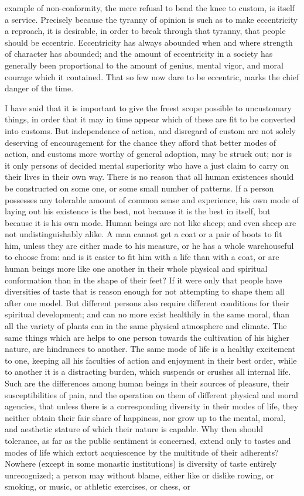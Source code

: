 \documentclass[12pt]{report}
\begin{document}
example of non-conformity, the mere refusal to bend the knee to custom, is itself a service. Precisely because the tyranny of opinion is such as to make eccentricity a reproach, it is desirable, in order to break through that tyranny, that people should be eccentric. Eccentricity has always abounded when and where strength of character has abounded; and the amount of eccentricity in a society has generally been proportional to the amount of genius, mental vigor, and moral courage which it contained. That so few now dare to be eccentric, marks the chief danger of the time.

I have said that it is important to give the freest scope possible to uncustomary things, in order that it may in time appear which of these are fit to be converted into customs. But independence of action, and disregard of custom are not solely deserving of encouragement for the chance they afford that better modes of action, and customs more worthy of general adoption, may be struck out; nor is it only persons of decided mental superiority who have a just claim to carry on their lives in their own way. There is no reason that all human existences should be constructed on some one, or some small number of patterns. If a person possesses any tolerable amount of common sense and experience, his own mode of laying out his existence is the best, not because it is the best in itself, but because it is his own mode. Human beings are not like sheep; and even sheep are not undistinguishably alike. A man cannot get a coat or a pair of boots to fit him, unless they are either made to his measure, or he has a whole warehouseful to choose from: and is it easier to fit him with a life than with a coat, or are human beings more like one another in their whole physical and spiritual conformation than in the shape of their feet? If it were only that people have diversities of taste that is reason enough for not attempting to shape them all after one model. But different persons also require different conditions for their spiritual development; and can no more exist healthily in the same moral, than all the variety of plants can in the same physical atmosphere and climate. The same things which are helps to one person towards the cultivation of his higher nature, are hindrances to another. The same mode of life is a healthy excitement to one, keeping all his faculties of action and enjoyment in their best order, while to another it is a distracting burden, which suspends or crushes all internal life. Such are the differences among human beings in their sources of pleasure, their susceptibilities of pain, and the operation on them of different physical and moral agencies, that unless there is a corresponding diversity in their modes of life, they neither obtain their fair share of happiness, nor grow up to the mental, moral, and aesthetic stature of which their nature is capable. Why then should tolerance, as far as the public sentiment is concerned, extend only to tastes and modes of life which extort acquiescence by the multitude of their adherents? Nowhere (except in some monastic institutions) is diversity of taste entirely unrecognized; a person may without blame, either like or dislike rowing, or smoking, or music, or athletic exercises, or chess, or 
\end{document}
